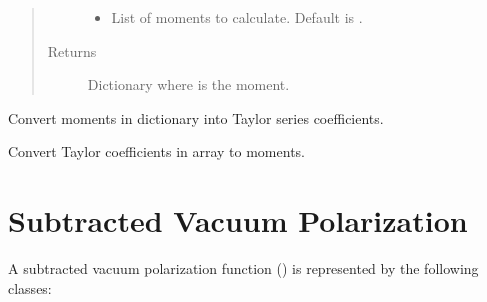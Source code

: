 \documentclass[letterpaper,10pt,english]{sphinxmanual}
\begin{document}
\begin{fulllineitems}
\begin{quote}
\begin{description}
\begin{itemize}
\item {} 
 \textendash{} List of moments to calculate. Default is
.

\end{itemize}

\item[{Returns}] \leavevmode
Dictionary  where  is the  moment.

\end{description}\end{quote}

\end{fulllineitems}


\begin{fulllineitems}
\label{\detokenize{g2tools:g2tools.mom2taylor}}
Convert moments in dictionary  into Taylor series coefficients.

\end{fulllineitems}


\begin{fulllineitems}
\label{\detokenize{g2tools:g2tools.taylor2mom}}
Convert Taylor coefficients in array  to moments.

\end{fulllineitems}



\section{Subtracted Vacuum Polarization}
\label{\detokenize{g2tools:subtracted-vacuum-polarization}}
A subtracted vacuum polarization function () is
represented by the following classes:
\end{document}

